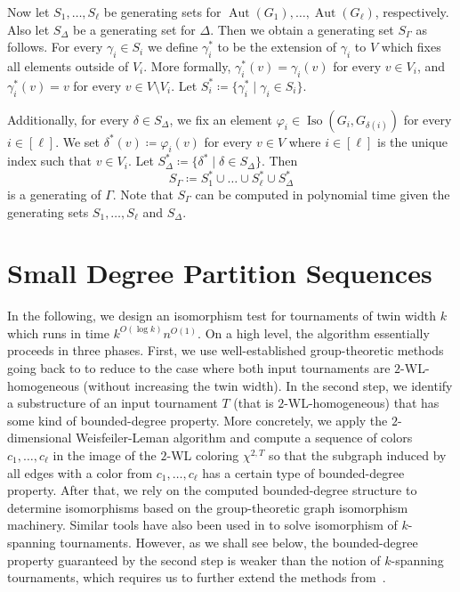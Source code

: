 \PassOptionsToPackage{dvipsnames,svgnames}{xcolor}\documentclass[10pt,a4paper]{article}
\newcommand{\WL}[2]{\chi^{#1,#2}}
\DeclareMathOperator{\Aut}{Aut}
\DeclareMathOperator{\Iso}{Iso}
\begin{document}
Now let $S_1,\dots,S_\ell$ be generating sets for $\Aut(G_1),\dots,\Aut(G_\ell)$, respectively.
Also let $S_\Delta$ be a generating set for $\Delta$.
Then we obtain a generating set $S_\Gamma$ as follows.
For every $\gamma_i \in S_i$ we define $\gamma_i^*$ to be the extension of $\gamma_i$ to $V$ which fixes all elements outside of $V_i$.
More formally, $\gamma_i^*(v) = \gamma_i(v)$ for every $v \in V_i$, and $\gamma_i^*(v) = v$ for every $v \in V \setminus V_i$.
Let $S_i^* \coloneqq \{\gamma_i^* \mid \gamma_i \in S_i\}$.

Additionally, for every $\delta \in S_\Delta$, we fix an element $\varphi_i \in \Iso(G_i,G_{\delta(i)})$ for every $i \in [\ell]$.
We set $\delta^*(v) \coloneqq \varphi_i(v)$ for every $v \in V$ where $i \in [\ell]$ is the unique index such that $v \in V_i$.
Let $S_\Delta^* \coloneqq \{\delta^* \mid \delta \in S_\Delta\}$.
Then
\[S_\Gamma \coloneqq S_1^* \cup \dots \cup S_\ell^* \cup S_\Delta^*\]
is a generating of $\Gamma$.
Note that $S_\Gamma$ can be computed in polynomial time given the generating sets $S_1,\dots,S_\ell$ and $S_\Delta$.


\section{Small Degree Partition Sequences}
\label{sec:partitions}

In the following, we design an isomorphism test for tournaments of twin width $k$ which runs in time $k^{O(\log k)}n^{O(1)}$.
On a high level, the algorithm essentially proceeds in three phases.
First, we use well-established group-theoretic methods going back to \cite{BabaiL83,Luks82} to reduce to the case where both input tournaments are $2$-WL-homogeneous (without increasing the twin width).
In the second step, we identify a substructure of an input tournament $T$ (that is $2$-WL-homogeneous) that has some kind of bounded-degree property.
More concretely, we apply the $2$-dimensional Weisfeiler-Leman algorithm and compute a sequence of colors $c_1,\dots,c_\ell$ in the image of the $2$-WL coloring $\WL{2}{T}$ so that the subgraph induced by all edges with a color from $c_1,\dots,c_\ell$ has a certain type of bounded-degree property.
After that, we rely on the computed bounded-degree structure to determine isomorphisms based on the group-theoretic graph isomorphism machinery.
Similar tools have also been used in \cite{ArvindPR25} to solve isomorphism of $k$-spanning tournaments.
However, as we shall see below, the bounded-degree property guaranteed by the second step is weaker than the notion of $k$-spanning tournaments, which requires us to further extend the methods from~\cite{ArvindPR25}.
\end{document}
